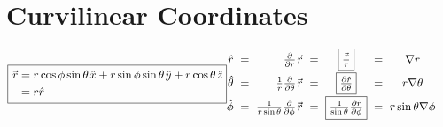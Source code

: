 \documentclass[12pt]{article}
\newcommand{\hs}{\hspace{1pt}} %
\newcommand{\hsvec}[1]{\vec{\hs #1}} %
\begin{document}
\section{Curvilinear Coordinates}

\(
    \boxed{ 
        \begin{aligned}
            \hsvec{r} & = r\cos\phi\sin\theta \hs \hat{x} + r\sin\phi\sin\theta \hs \hat{y} + r\cos\theta \hs \hat{z} \\
            & = r \hat{r} 
        \end{aligned}    
    }
    \hfill
    \begin{aligned}
        & \hspace{-3pt} \arraycolsep=3pt\begin{array}{r c r c c c c}
                \hat{r} & = 
                    & \tfrac{\partial}{\partial r} \hsvec{r} 
                    & = 
                    & \boxed{ \tfrac{\hsvec{r}}{r} }
                    & = 
                    & \nabla r
                    \\[5pt]
                \hat{\theta} & = 
                    & \tfrac{1}{r} \tfrac{\partial}{\partial \theta} \hsvec{r}
                    & = 
                    & \boxed{ \tfrac{\partial \hat{r}}{\partial \theta} }
                    & =
                    & r \nabla \theta
                    \\[5pt]
                \hat{\phi} & = 
                    & \tfrac{1}{r \sin\theta} \tfrac{\partial}{\partial \phi} \hsvec{r}
                    & = 
                    & \boxed{ \tfrac{1}{\sin\theta} \tfrac{\partial \hat{r}}{\partial \phi} }
                    & =
                    & r \sin\theta \nabla \phi
            \end{array}
    \end{aligned}
    \hfill\hs
\)
\end{document}
